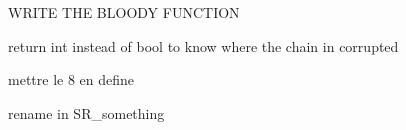 
\begin{DoxyRefList}
\item[Member \mbox{\hyperlink{_functions_8h_a615faf85d13d549ae9bb515b4f8f2137}{load\+From\+Teensy}} ()]\label{todo__todo000001}%
%
W\+R\+I\+TE T\+HE B\+L\+O\+O\+DY F\+U\+N\+C\+T\+I\+ON 
\item[Member \mbox{\hyperlink{class_s_r_chain_a6e0735429deb58be763f0af02555dc66}{S\+R\+Chain\+::ping}} ()]\label{todo__todo000002}%
%
return int instead of bool to know where the chain in corrupted 
\item[Member \mbox{\hyperlink{class_s_r_chain_a7ad1689343ea6619b10b0c498f7178d5}{S\+R\+Chain\+::scan}} ()]\label{todo__todo000003}%
%
mettre le 8 en define 
\item[Member \mbox{\hyperlink{class_s_r_chain_a867d1ec6b028ca92859720ecc3120153}{S\+R\+Chain\+::turn\+On}} (int i)]\label{todo__todo000004}%
%
rename in S\+R\+\_\+something 
\end{DoxyRefList}